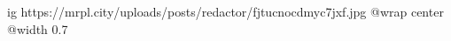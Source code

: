  
 
 
 
 

\ifcmt
  ig https://mrpl.city/uploads/posts/redactor/fjtucnocdmyc7jxf.jpg
  @wrap center
  @width 0.7
\fi
